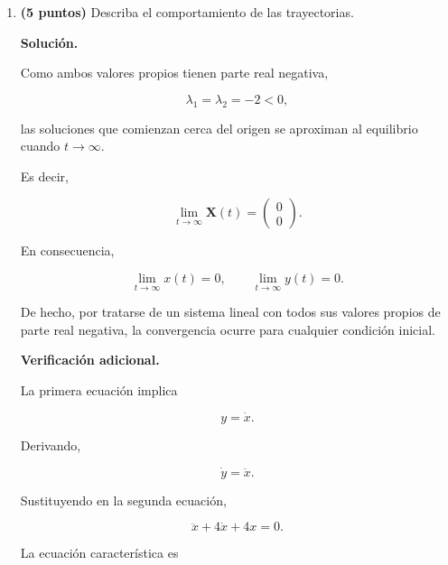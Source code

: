\documentclass[a4paper,12pt]{article}
\newcommand{\solucion}{
\par\medskip
{\color{solutioncolor}\textbf{Solución.}}
\par
}
\begin{document}
\begin{enumerate}[leftmargin=*,
itemsep=0.8cm]
\begin{enumerate}[label=\alph*),
leftmargin=*,itemsep=0.5cm]
En consecuencia, los vectores
propios tienen la forma

\[
\mathbf u=s
\begin{pmatrix}
1\\-2
\end{pmatrix},
\qquad s\neq0.
\]

Existe solamente una dirección
propia linealmente independiente.

Por consiguiente, la matriz
no es diagonalizable.

Como el valor propio repetido
es negativo, el equilibrio
es un

\[
\boxed{
\text{nodo estable degenerado}
}
\]

también llamado
\textbf{nodo impropio estable}.

En particular, el origen
es asintóticamente estable.

\item \textbf{(5 puntos)}
Describa el comportamiento
de las trayectorias.

\solucion

Como ambos valores propios
tienen parte real negativa,

\[
\lambda_1=\lambda_2=-2<0,
\]

las soluciones que comienzan
cerca del origen se aproximan
al equilibrio cuando
$t\to\infty$.

Es decir,

\[
\boxed{
\lim_{t\to\infty}
\mathbf X(t)
=
\begin{pmatrix}
0\\0
\end{pmatrix}.
}
\]

En consecuencia,

\[
\lim_{t\to\infty}x(t)=0,
\qquad
\lim_{t\to\infty}y(t)=0.
\]

De hecho, por tratarse de
un sistema lineal con todos
sus valores propios de parte
real negativa, la convergencia
ocurre para cualquier condición
inicial.

\textbf{Verificación adicional.}

La primera ecuación implica

\[
y=\dot x.
\]

Derivando,

\[
\dot y=\ddot x.
\]

Sustituyendo en la segunda
ecuación,

\[
\ddot x+4\dot x+4x=0.
\]

La ecuación característica es


\end{enumerate}
\end{enumerate}
\end{document}
